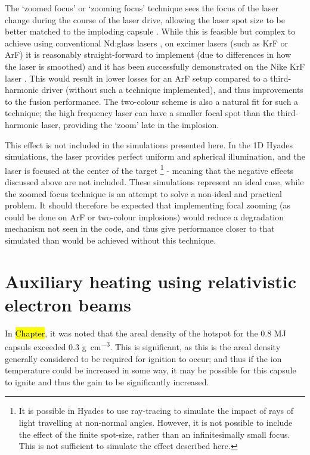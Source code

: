 The `zoomed focus' or `zooming focus' technique sees the focus of the laser change during the course of the laser drive, allowing the laser spot size to be better matched to the imploding capsule \cite{Kehne2013, Eimerl2014}. While this is feasible but complex to achieve using conventional Nd:glass lasers \cite{Obenschain2015}, on excimer lasers (such as KrF or ArF) it is reasonably straight-forward to implement (due to differences in how the laser is smoothed) and it has been successfully demonstrated on the Nike KrF laser \cite{Kehne2013}. This would result in lower losses for an ArF setup compared to a third-harmonic driver (without such a technique implemented), and thus improvements to the fusion performance. The two-colour scheme is also a natural fit for such a technique; the high frequency laser can have a smaller focal spot than the third-harmonic laser, providing the `zoom' late in the implosion.

This effect is not included in the simulations presented here. In the 1D Hyades simulations, the laser provides perfect uniform and spherical illumination, and the laser is focused at the center of the target \footnote{It is possible in Hyades to use ray-tracing to simulate the impact of rays of light travelling at non-normal angles. However, it is not possible to include the effect of the finite spot-size, rather than an infinitesimally small focus. This is not sufficient to simulate the effect described here.} - meaning that the negative effects discussed above are not included. These simulations represent an ideal case, while the zoomed focus technique is an attempt to solve a non-ideal and practical problem. It should therefore be expected that implementing focal zooming (as could be done on ArF or two-colour implosions) would reduce a degradation mechanism not seen in the code, and thus give performance closer to that simulated than would be achieved without this technique.

\section{Auxiliary heating using relativistic electron beams}

In \hl{Chapter}, it was noted that the areal density of the hotspot for the 0.8 MJ capsuls exceeded 0.3 \unit{\gram\per\centi\meter\cubed}. This is significant, as this is the areal density generally considered to be required for ignition to occur; and thus if the ion temperature could be increased in some way, it may be possible for this capsule to ignite and thus the gain to be significantly increased.

